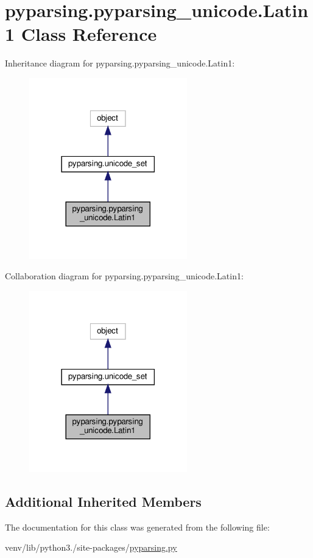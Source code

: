 \hypertarget{classpyparsing_1_1pyparsing__unicode_1_1Latin1}{}\section{pyparsing.\+pyparsing\+\_\+unicode.\+Latin1 Class Reference}
\label{classpyparsing_1_1pyparsing__unicode_1_1Latin1}


Inheritance diagram for pyparsing.\+pyparsing\+\_\+unicode.\+Latin1\+:
\nopagebreak
\begin{figure}[H]
\begin{center}
\leavevmode
\includegraphics[width=194pt]{classpyparsing_1_1pyparsing__unicode_1_1Latin1__inherit__graph}
\end{center}
\end{figure}


Collaboration diagram for pyparsing.\+pyparsing\+\_\+unicode.\+Latin1\+:
\nopagebreak
\begin{figure}[H]
\begin{center}
\leavevmode
\includegraphics[width=194pt]{classpyparsing_1_1pyparsing__unicode_1_1Latin1__coll__graph}
\end{center}
\end{figure}
\subsection*{Additional Inherited Members}


The documentation for this class was generated from the following file\+:\begin{DoxyCompactItemize}
\item 
venv/lib/python3./site-\/packages/\hyperlink{pyparsing_8py}{pyparsing.\+py}\end{DoxyCompactItemize}
